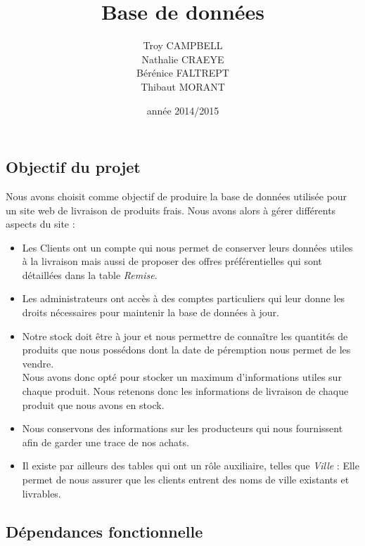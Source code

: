 \documentclass[a4paper, 12pt]{report}
\title{Base de données}
\author{Troy CAMPBELL \\ Nathalie CRAEYE \\ Bérénice FALTREPT \\ Thibaut MORANT}
\date{année 2014/2015}
\begin{document}
    \begin{spacing}{1.2}
\maketitle%
\newpage

\textcolor{colortitre1}{\section*{Objectif du projet}} 

Nous avons choisit comme objectif de produire la base de données utilisée pour un site web de livraison de produits frais. Nous avons alors à gérer différents aspects du site : 
\begin{itemize}
	\item Les Clients ont un compte qui nous permet de conserver leurs données utiles à la livraison mais aussi de proposer des offres préférentielles qui sont détaillées dans la table \textit{Remise}. 
	\item Les administrateurs ont accès à des comptes particuliers qui leur donne les droits nécessaires pour maintenir la base de données à jour.
	\item Notre stock doit être à jour et nous permettre de connaître les quantités de produits que nous possédons dont la date de péremption nous permet de les vendre. \\ Nous avons donc opté pour stocker un maximum d'informations utiles sur chaque produit. Nous retenons donc les informations de livraison de chaque produit que nous avons en stock.
	\item Nous conservons des informations sur les producteurs qui nous fournissent afin de garder une trace de nos achats.
	\item Il existe par ailleurs des tables qui ont un rôle auxiliaire, telles que \textit{Ville} : Elle permet de nous assurer que les clients entrent des noms de ville existants et livrables.
\end{itemize}





\textcolor{colortitre2}{\subsection*{Dépendances fonctionnelle}} 


\end{spacing}
\end{document}
